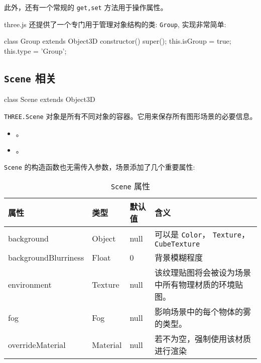 此外，还有一个常规的 \texttt{get,set} 方法用于操作属性。

three.js 还提供了一个专门用于管理对象结构的类: \texttt{Group}, 实现非常简单:

\begin{JavaScript}
class Group extends Object3D {
	constructor() {
		super();
		this.isGroup = true;
		this.type = 'Group';
	}
}
\end{JavaScript}

\subsection{\texttt{Scene} 相关}

\begin{JavaScript}
class Scene extends Object3D
\end{JavaScript}

\texttt{THREE.Scene} 对象是所有不同对象的容器。它用来保存所有图形场景的必要信息。

\begin{itemize}
  \item {}。
  \item {}。
\end{itemize}

\texttt{Scene} 的构造函数也无需传入参数，场景添加了几个重要属性:

\begin{table}[H]
  \small
  \centering
  \caption{\texttt{Scene} 属性}
  \setlength{\tabcolsep}{4mm}
  \begin{tabular}{l|l|l|p{8cm}}
    \toprule
    \textbf{属性} & \textbf{类型} & \textbf{默认值} & \textbf{含义} \\
    \midrule
    background & Object & null & 可以是 \texttt{Color}， \texttt{Texture}，\texttt{CubeTexture} \\
    backgroundBlurriness & Float & 0 & 背景模糊程度 \\
    environment & Texture & null & 该纹理贴图将会被设为场景中所有物理材质的环境贴图。 \\
    fog & Fog & null & 影响场景中的每个物体的雾的类型。 \\
    overrideMaterial & Material & null & 若不为空，强制使用该材质进行渲染 \\
    \bottomrule
  \end{tabular}
\end{table}

